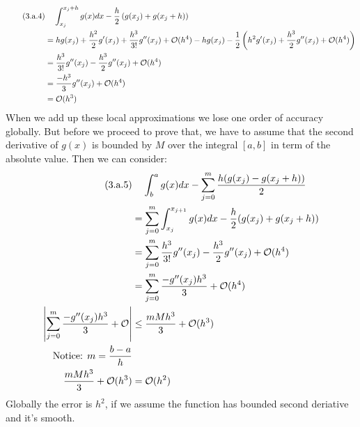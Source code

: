 \documentclass[]{article}
\begin{document}
        \begin{align*}\tag{3.a.4}\label{eqn:3.a.4}
            &\hspace{1.1em}
            \int_{x_j}^{x_j + h} 
            g(x)
            dx - \frac{h}{2}\left(
                g(x_j) + g(x_j + h)
            \right)
            \\
            &= 
            hg(x_j) + \frac{h^2}{2}g'(x_j) + \frac{h^3}{3!}g''(x_j) + \mathcal{O}(h^4) - 
            hg(x_j) - 
            \frac{1}{2}
            \left(
                h^2g'(x_j) + \frac{h^3}{2}g''(x_j) + \mathcal{O}(h^4)
            \right)
            \\
            &= \frac{h^3}{3!}g''(x_j) - \frac{h^3}{2}g''(x_j) + \mathcal{O}(h^4)
            \\
            &= \frac{-h^3}{3}g''(x_j) + \mathcal{O}(h^4)
            \\
            &= \mathcal{O}(h^3)
        \end{align*}
        When we add up these local approximations we lose one order of accuracy globally. But before we proceed to prove that, we have to assume that the second derivative of $g(x)$ is bounded by $M$ over the integral $[a, b]$ in term of the absolute value. Then we can consider: 
        \begin{align*}\tag{3.a.5}\label{eqn:3.a.5}
            &\hspace{1.1em}
            \int_{b}^{a}g(x)dx - \sum_{j = 0}^{m}
            \frac{h(g(x_j) - g(x_j + h))}{2}
            \\
            &= \sum_{j = 0}^{m}
            \int_{x_j}^{x_{j + 1}} g(x)dx - 
            \frac{h}{2}(g(x_j)+ g(x_j + h))
            \\
            &= 
            \sum_{j = 0}^{m}\frac{h^3}{3!}g''(x_j) - 
            \frac{h^3}{2}g''(x_j) + \mathcal{O}(h^4)
            \\
            &= \sum_{j = 0}^{m} \frac{-g''(x_j)h^3}{3} + \mathcal{O}(h^4)
            \\
            \left|\sum_{j = 0}^{m} \frac{-g''(x_j)h^3}{3} + \mathcal{O}\right|
            & \le 
            \frac{mMh^3}{3} + \mathcal{O}(h^3)
            \\
            \text{Notice: } m = \frac{b - a}{h} 
            \\
            \frac{mMh^3}{3} + \mathcal{O}(h^3) &= 
            \mathcal{O}(h^2)
        \end{align*}
    Globally the error is $h^2$, if we assume the function has bounded second deriative and it's smooth.
\end{document}
